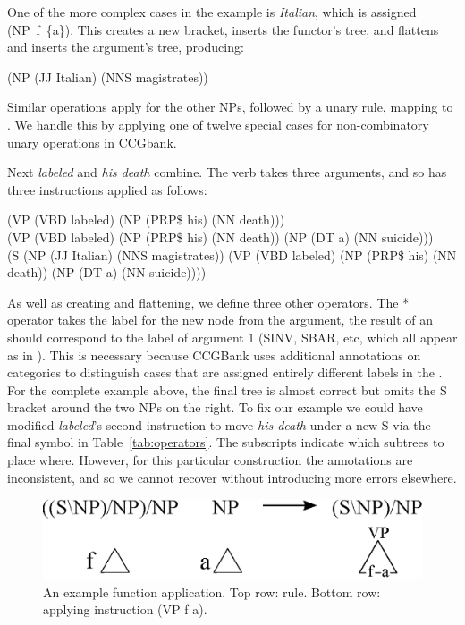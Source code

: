 One of the more complex cases in the example is \textit{Italian}, which is
assigned (NP~f~\{a\}). This creates a new bracket, inserts the functor's tree, and
flattens and inserts the argument's tree, producing:

\vspace{1mm}
\noindent
(NP (JJ Italian) (NNS magistrates))
\vspace{1mm}

Similar operations apply for the other NPs, followed by a unary rule,
mapping  to .  We handle this by applying one of twelve special
cases for non-combinatory unary operations in CCGbank.

Next \textit{labeled} and \textit{his death} combine.  The verb takes three
arguments, and so has three instructions applied as follows:

\vspace{1mm}
\noindent
(VP (VBD labeled) (NP (PRP\$ his) (NN death))) \\
(VP (VBD labeled) (NP (PRP\$ his) (NN death)) (NP (DT a) (NN suicide))) \\
(S (NP (JJ Italian) (NNS magistrates)) (VP (VBD labeled) (NP (PRP\$ his) (NN death)) (NP (DT a) (NN suicide))))
\vspace{1mm}

As well as creating and flattening, we define three other operators.
The * operator takes the label for the new node from the argument,
\myeg the result of an  should correspond to the label of
argument 1 (SINV, SBAR, etc, which all appear as  in \ccg).
This is necessary because CCGBank uses additional annotations on categories to distinguish cases that are assigned entirely different labels in the \ptb.
For the complete example above, the final tree is almost correct but omits the S bracket around the two NPs on the right.
To fix our example we could have modified \textit{labeled}'s second instruction to move \textit{his death} under a new S via the final symbol in Table~\ref{tab:operators}.
The subscripts indicate which subtrees to place where.
However, for this particular construction the \ptb annotations are inconsistent, and so we cannot recover without introducing more errors elsewhere.

\begin{figure}
\centering
\includegraphics[width=0.85\linewidth]{figures/ccg-example}
\caption{\label{fig:inst-example}
An example function application.
Top row: \ccg rule.
Bottom row: applying instruction (VP f a).
}
\end{figure}

